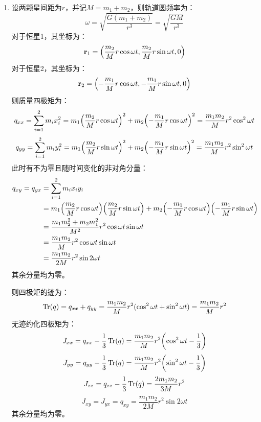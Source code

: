 \documentclass[a4paper]{article}
\begin{document}
\begin{enumerate}
    则四极矩的迹为：
    \[
        \Tr(q) = q_{xx} = \frac{mM}{m + M} (b_0 + 2A\cos{\omega t})^2
    \]
    无迹约化四极矩为：
    \[
        J_{xx} = q_{xx} - \frac{1}{3} \Tr(q) = \frac{2mM}{3(m + M)} (b_0 + 2A\cos{\omega t})^2
    \]
    \[
        J_{yy} = q_{yy} - \frac{1}{3} \Tr(q) = -\frac{mM}{3(m + M)} (b_0 + 2A\cos{\omega t})^2
    \]
    \[
        J_{zz} = q_{zz} - \frac{1}{3} \Tr(q) = -\frac{mM}{3(m + M)} (b_0 + 2A\cos{\omega t})^2
    \]
    其余分量均为零。

    \item[9.]
    设两颗星间距为$r$，并记$M = m_1 + m_2$，则轨道圆频率为：
    \[
        \omega = \sqrt{\frac{G(m_1 + m_2)}{r^3}} = \sqrt{\frac{GM}{r^3}}
    \]
    对于恒星1，其坐标为：
    \[
        \mathbf{r}_1 = \qty(\frac{m_2}{M} r \cos{\omega t}, \frac{m_2}{M} r \sin{\omega t}, 0)
    \]
    对于恒星2，其坐标为：
    \[
        \mathbf{r}_2 = \qty(-\frac{m_1}{M} r \cos{\omega t}, -\frac{m_1}{M} r \sin{\omega t}, 0)
    \]
    则质量四极矩为：
    \[
        q_{xx} = \sum_{i=1}^2 m_i x_i^2 = m_1 \qty(\frac{m_2}{M} r \cos{\omega t})^2 + m_2 \qty(-\frac{m_1}{M} r \cos{\omega t})^2 = \frac{m_1 m_2}{M} r^2 \cos^2{\omega t}
    \]
    \[
        q_{yy} = \sum_{i=1}^2 m_i y_i^2 = m_1 \qty(\frac{m_2}{M} r \sin{\omega t})^2 + m_2 \qty(-\frac{m_1}{M} r \sin{\omega t})^2 = \frac{m_1 m_2}{M} r^2 \sin^2{\omega t}
    \]
    此时有不为零且随时间变化的非对角分量：
    \begin{align*}
        q_{xy} = q_{yx}
        &= \sum_{i=1}^2 m_i x_i y_i \\
        &= m_1 \qty(\frac{m_2}{M} r \cos{\omega t}) \qty(\frac{m_2}{M} r \sin{\omega t}) + m_2 \qty(-\frac{m_1}{M} r \cos{\omega t}) \qty(-\frac{m_1}{M} r \sin{\omega t}) \\
        &= \frac{m_1 m_2^2 + m_2 m_1^2}{M^2} r^2 \cos{\omega t} \sin{\omega t} \\
        &= \frac{m_1 m_2}{M} r^2 \cos{\omega t} \sin{\omega t} \\
        &= \frac{m_1 m_2}{2M} r^2 \sin{2\omega t}
    \end{align*}
    其余分量均为零。

    则四极矩的迹为：
    \[
        \Tr(q) = q_{xx} + q_{yy} = \frac{m_1 m_2}{M} r^2 (\cos^2{\omega t} + \sin^2{\omega t}) = \frac{m_1 m_2}{M} r^2
    \]
    无迹约化四极矩为：
    \[
        J_{xx} = q_{xx} - \frac{1}{3} \Tr(q) = \frac{m_1 m_2}{M} r^2 \qty(\cos^2{\omega t} - \frac{1}{3})
    \]
    \[
        J_{yy} = q_{yy} - \frac{1}{3} \Tr(q) = \frac{m_1 m_2}{M} r^2 \qty(\sin^2{\omega t} - \frac{1}{3})
    \]
    \[
        J_{zz} = q_{zz} - \frac{1}{3} \Tr(q) = \frac{2m_1 m_2}{3M} r^2
    \]
    \[
        J_{xy} = J_{yx} = q_{xy} = \frac{m_1 m_2}{2M} r^2 \sin{2\omega t}
    \]
    其余分量均为零。


\end{enumerate}
\end{document}
